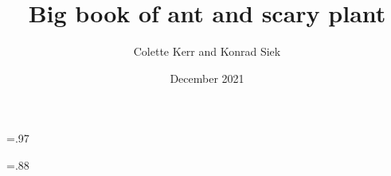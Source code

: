 \documentclass[a4paper,landscape,twoside]{memoir}
\begin{document}
\title{Big book of ant and scary plant}
\author{Colette Kerr and Konrad Siek}
\date{December 2021}

\newlength{\verticalheight}
\verticalheight=.97\textheight

\newlength{\landscapeheight}
\landscapeheight=.88\textheight

\newcommand{\blankpage}{%
    \null
    \thispagestyle{empty}%
    \addtocounter{page}{-1}%
    \newpage}

\newcommand{\descriptioncolor}{white}
\pagecolor{black}

{\color{\descriptioncolor}
\maketitle
}

\newif\ifportrait

\newcommand{\portrait}[3]{%
\noindent
\begin{minipage}[t]{.5\linewidth}{\color{\descriptioncolor}
    \texttt{[image: \#1]}
}\end{minipage}
\begin{minipage}[t][\verticalheight]{.4\linewidth}
\vfill
\begin{minipage}[b][.5\verticalheight]{\linewidth}{\color{\descriptioncolor}
#2
}\end{minipage}
\begin{minipage}[b][.5\verticalheight]{\linewidth}{\color{\descriptioncolor}
#3
}\end{minipage} 
\end{minipage}
\hfill
\pagebreak
}

\newcommand{\landscape}[3]{%
\noindent
\begin{minipage}{.98\linewidth}
\texttt{[image: \#1]}
\end{minipage}
\\[\baselineskip]
\begin{minipage}[t]{\linewidth}
\begin{minipage}[t]{.4\linewidth}{\color{\descriptioncolor}
#2
}\end{minipage}
\hfill
\begin{minipage}[t]{.4\linewidth}{\color{\descriptioncolor}
#3
}\end{minipage}
\end{minipage}
\pagebreak
}
\end{document}
